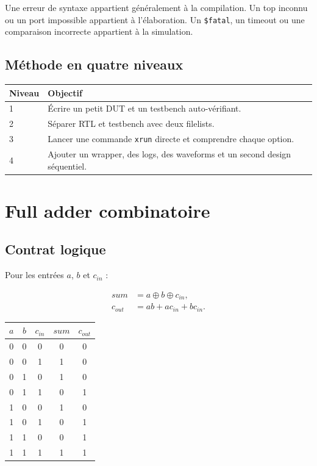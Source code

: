 \documentclass[11pt,a4paper,openany]{report}
\begin{document}
Une erreur de syntaxe appartient généralement à la compilation. Un top inconnu
ou un port impossible appartient à l'élaboration. Un \texttt{\$fatal}, un
timeout ou une comparaison incorrecte appartient à la simulation.

\section{Méthode en quatre niveaux}

\begin{longtable}{p{}p{}}
\toprule
Niveau & Objectif \\
\midrule
1 & Écrire un petit DUT et un testbench auto-vérifiant. \\
2 & Séparer RTL et testbench avec deux filelists. \\
3 & Lancer une commande \texttt{xrun} directe et comprendre chaque option. \\
4 & Ajouter un wrapper, des logs, des waveforms et un second design séquentiel. \\
\bottomrule
\end{longtable}

\chapter{Full adder combinatoire}

\section{Contrat logique}

Pour les entrées $a$, $b$ et $c_{in}$ :

\begin{align}
  sum &= a \oplus b \oplus c_{in},\\
  c_{out} &= ab + ac_{in} + bc_{in}.
\end{align}

\begin{center}
\begin{tabular}{ccc|cc}
\toprule
$a$ & $b$ & $c_{in}$ & $sum$ & $c_{out}$ \\
\midrule
0&0&0&0&0\\
0&0&1&1&0\\
0&1&0&1&0\\
0&1&1&0&1\\
1&0&0&1&0\\
1&0&1&0&1\\
1&1&0&0&1\\
1&1&1&1&1\\
\bottomrule
\end{tabular}
\end{center}
\end{document}
